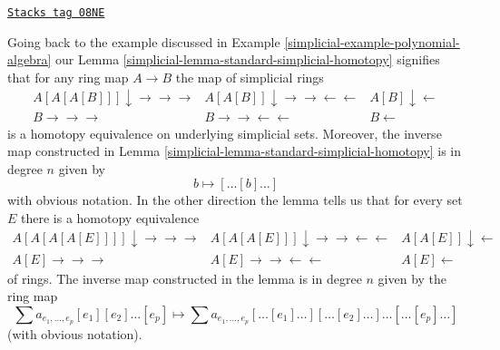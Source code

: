 \begin{example}
\label{simplicial-example-polynomial-algebra-homotopy}
\href{https://stacks.math.columbia.edu/tag/08NE}{\texttt{Stacks tag 08NE}}

Going back to the example discussed in
Example \ref{simplicial-example-polynomial-algebra}
our Lemma \ref{simplicial-lemma-standard-simplicial-homotopy}
signifies that for any ring map $A \to B$ the map of simplicial rings
$$
\begin{array}{ccc}A[A[A[B]]] \downarrow\longrightarrow\longrightarrow\longrightarrow & A[A[B]] \downarrow\longrightarrow\longrightarrow\longleftarrow\longleftarrow & A[B] \downarrow\longleftarrow \\ B
\longrightarrow\longrightarrow\longrightarrow & B
\longrightarrow\longrightarrow\longleftarrow\longleftarrow & B
\longleftarrow\end{array}
$$
is a homotopy equivalence on underlying simplicial sets. Moreover, the inverse
map constructed in Lemma \ref{simplicial-lemma-standard-simplicial-homotopy}
is in degree $n$ given by
$$
b \longmapsto [\ldots[b]\ldots]
$$
with obvious notation. In the other direction the lemma tells us that
for every set $E$ there is a homotopy equivalence
$$
\begin{array}{ccc}A[A[A[A[E]]]] \downarrow\longrightarrow\longrightarrow\longrightarrow & A[A[A[E]]] \downarrow\longrightarrow\longrightarrow\longleftarrow\longleftarrow & A[A[E]] \downarrow\longleftarrow \\ A[E]
\longrightarrow\longrightarrow\longrightarrow & A[E]
\longrightarrow\longrightarrow\longleftarrow\longleftarrow & A[E]
\longleftarrow\end{array}
$$
of rings. The inverse map constructed in the lemma is in degree $n$
given by the ring map
$$
\sum a_{e_1,\ldots,e_p}[e_1][e_2] \ldots [e_p]
\longmapsto
\sum a_{e_1,\ldots,e_p}[\ldots[e_1]\ldots][\ldots[e_2]\ldots]
\ldots [\ldots[e_p]\ldots]
$$
(with obvious notation).
\end{example}




